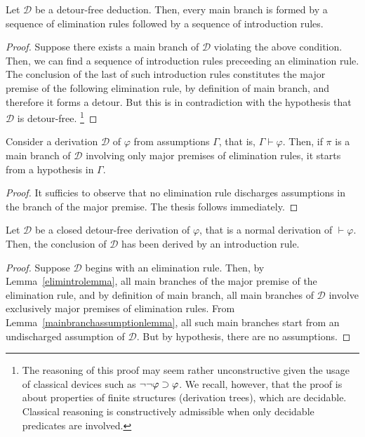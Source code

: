 \begin{lemma}\label{elimintrolemma}
  Let $\mathcal{D}$ be a detour-free deduction. Then, every main branch is
  formed by a sequence of elimination rules followed by a sequence of
  introduction rules.
\end{lemma}
\begin{proof}
  Suppose there exists a main branch of $\mathcal{D}$ violating the above
  condition. Then, we can find a sequence of introduction rules preceeding an
  elimination rule. The conclusion of the last of such introduction rules
  constitutes the major premise of the following elimination rule, by definition
  of main branch, and therefore it forms a detour. But this is in contradiction
  with the hypothesis that $\mathcal{D}$ is detour-free.
  \footnote{
    The reasoning of this proof may seem rather unconstructive given the usage
    of classical devices such as $\neg \neg \varphi \supset \varphi$. We
    recall, however, that the proof is about properties of finite structures
    (derivation trees), which are decidable. Classical reasoning is
    constructively admissible when only decidable predicates are involved.}
\end{proof}

\begin{lemma}\label{mainbranchassumptionlemma}
  Consider a derivation $\mathcal{D}$ of $\varphi$ from assumptions $\Gamma$,
  that is, $\Gamma \vdash \varphi$. Then, if $\pi$ is a main branch of
  $\mathcal{D}$ involving only major premises of elimination rules, it
  starts from a hypothesis in $\Gamma$.
\end{lemma}
\begin{proof}
  It sufficies to observe that no elimination rule discharges assumptions in the
  branch of the major premise. The thesis follows immediately.
\end{proof}

\begin{theorem}\label{canonicalproofthrm}
  Let $\mathcal{D}$ be a closed detour-free derivation of $\varphi$, that is a
  normal derivation of $\vdash \varphi$. Then, the conclusion of $\mathcal{D}$
  has been derived by an introduction rule.
\end{theorem}
\begin{proof}
  Suppose $\mathcal{D}$ begins with an elimination rule. Then, by
  Lemma~\ref{elimintrolemma}, all main branches of the major premise of the
  elimination rule, and by definition of main branch, all main branches of
  $\mathcal{D}$ involve exclusively major premises of elimination rules. From
  Lemma~\ref{mainbranchassumptionlemma}, all such main branches start from an
  undischarged assumption of $\mathcal{D}$. But by hypothesis, there are no
  assumptions.
\end{proof}

